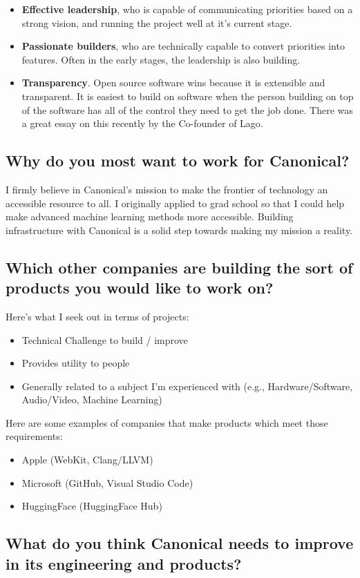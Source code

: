 \documentclass{article}
\begin{document}
\begin{itemize}
  \item \textbf{Effective leadership}, who is capable of communicating
        priorities based on a strong vision, and running the project well at it's
        current stage.
  \item \textbf{Passionate builders}, who are technically capable to convert priorities
        into features. Often in the early stages, the leadership is also building.
  \item \textbf{Transparency}. Open source software wins because it is
        extensible and transparent. It is easiest to build on software when the
        person building on top of the software has all of the control they need to
        get the job done. There was a great essay on this recently by the Co-founder
        of Lago\cite{oss_cheap}.
\end{itemize}

\subsection{Why do you most want to work for Canonical?}


I firmly believe in Canonical's mission to make the frontier of technology an accessible
resource to all. I originally applied to grad school so that I could help make advanced
machine learning methods more accessible. Building infrastructure with Canonical is a
solid step towards making my mission a reality.

\subsection{Which other companies are building the sort of products you would
  like to work on?}
Here's what I seek out in terms of projects:
\begin{itemize}
  \item Technical Challenge to build / improve
  \item Provides utility to people
  \item Generally related to a subject I'm experienced with (e.g., Hardware/Software, Audio/Video, Machine Learning)
\end{itemize}
Here are some examples of companies that make products which meet those
requirements:
\begin{itemize}
  \item Apple (WebKit, Clang/LLVM)
  \item Microsoft (GitHub, Visual Studio Code)
  \item HuggingFace (HuggingFace Hub)
\end{itemize} \subsection{What do you think Canonical needs to improve in its
  engineering and products?}
\end{document}
